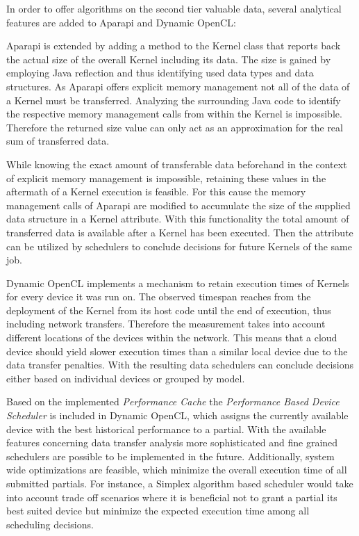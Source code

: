 In order to offer algorithms on the second tier valuable data, several analytical features are added to Aparapi and Dynamic OpenCL:
\begin{description}[style=nextline]
	\item[Kernel Data Size] 
	Aparapi is extended by adding a method to the Kernel class that reports back the actual size of the overall Kernel including its data. The size is gained by employing Java reflection and thus identifying used data types and data structures. As Aparapi offers explicit memory management not all of the data of a Kernel must be transferred. Analyzing the surrounding Java code to identify the respective memory management calls from within the Kernel is impossible. Therefore the returned size value can only act as an approximation for the real sum of transferred data.
	\item[Historical Data Transfer] 
	While knowing the exact amount of transferable data beforehand in the context of explicit memory management is impossible, retaining these values in the aftermath of a Kernel execution is feasible. For this cause the memory management calls of Aparapi are modified to accumulate the size of the supplied data structure in a Kernel attribute. With this functionality the total amount of transferred data is available after a Kernel has been executed. Then the attribute can be utilized by schedulers to conclude decisions for future Kernels of the same job.
	\item[Performance Cache]
	Dynamic OpenCL implements a mechanism to retain execution times of Kernels for every device it was run on. The observed timespan reaches from the deployment of the Kernel from its host code until the end of execution, thus including network transfers. Therefore the measurement takes into account different locations of the devices within the network. This means that a cloud device should yield slower execution times than a similar local device due to the data transfer penalties. With the resulting data schedulers can conclude decisions either based on individual devices or grouped by model.
\end{description}

Based on the implemented \textit{Performance Cache} the \textit{Performance Based Device Scheduler} is included in Dynamic OpenCL, which assigns the currently available device with the best historical performance to a partial. With the available features concerning data transfer analysis more sophisticated and fine grained schedulers are possible to be implemented in the future. Additionally, system wide optimizations are feasible, which minimize the overall execution time of all submitted partials. For instance, a Simplex algorithm based scheduler would take into account trade off scenarios where it is beneficial not to grant a partial its best suited device but minimize the expected execution time among all scheduling decisions. 


